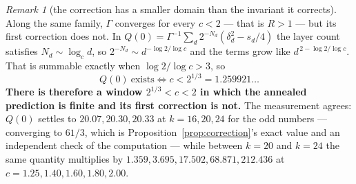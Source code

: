 \documentclass[11pt,a4paper]{article}
\theoremstyle{plain}
\theoremstyle{definition}
\theoremstyle{remark}
\newtheorem{remark}[theorem]{Remark}
\begin{document}
\begin{remark}[the correction has a smaller domain than the invariant it corrects]\label{rem:qcrit}
Along the same family, $\Gamma$ converges for every $c<2$ --- that is $R>1$ --- but its first
correction does not. In $Q(0)=\Gamma^{-1}\sum_d2^{-N_d}(\delta_d^{2}-s_d/4)$ the layer count
satisfies $N_d\sim\log_c d$, so $2^{-N_d}\sim d^{-\log2/\log c}$ and the terms grow like
$d^{\,2-\log2/\log c}$. That is summable exactly when $\log2/\log c>3$, so
\[
  Q(0)\ \text{exists}\iff c<2^{1/3}=1.259921\ldots
\]
\textbf{There is therefore a window $2^{1/3}<c<2$ in which the annealed prediction is finite and
its first correction is not.} The measurement agrees: $Q(0)$ settles to $20.07,20.30,20.33$ at
$k=16,20,24$ for the odd numbers --- converging to $61/3$, which is
Proposition~\ref{prop:correction}'s exact value and an independent check of the computation ---
while between $k=20$ and $k=24$ the same quantity multiplies by
$1.359,3.695,17.502,68.871,212.436$ at $c=1.25,1.40,1.60,1.80,2.00$.


\end{remark}
\end{document}
